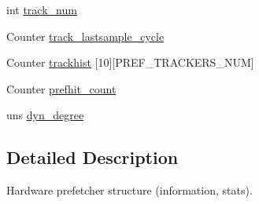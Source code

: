 \begin{DoxyCompactItemize}
\item 
int \hyperlink{structpref__info__s_a0c42749d820824d50ada89d498523f29}{track\_\-num}
\item 
Counter \hyperlink{structpref__info__s_a1151a69f70f1518d9223e15d91479300}{track\_\-lastsample\_\-cycle}
\item 
Counter \hyperlink{structpref__info__s_aa709dbfe970425b137e63b8376792392}{trackhist} \mbox{[}10\mbox{]}\mbox{[}PREF\_\-TRACKERS\_\-NUM\mbox{]}
\item 
Counter \hyperlink{structpref__info__s_a84a8db7783a6a9ae781fc5e5ee66b9da}{prefhit\_\-count}
\item 
uns \hyperlink{structpref__info__s_a99fd5a2733a16f8e4c89a91a87d219da}{dyn\_\-degree}
\end{DoxyCompactItemize}


\subsection{Detailed Description}
Hardware prefetcher structure (information, stats). 

